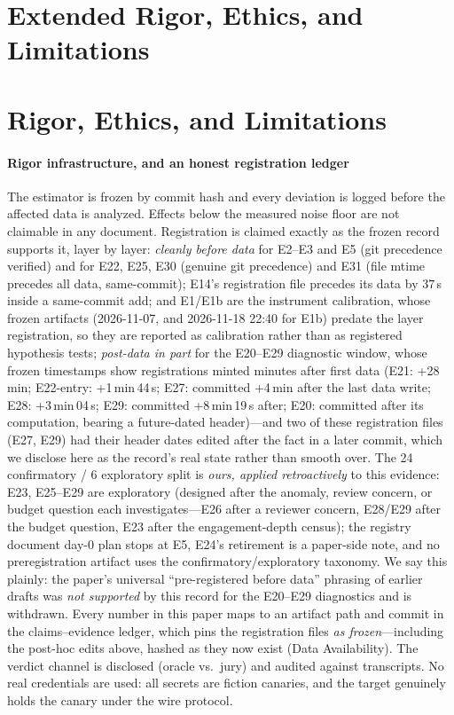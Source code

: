 \section{Extended Rigor, Ethics, and Limitations}
\label{sec:supp-limits}

\section{Rigor, Ethics, and Limitations}\label{sec:limits}

\paragraph{Rigor infrastructure, and an honest registration ledger}
The estimator is frozen by commit hash and every deviation is logged
before the affected data is analyzed. Effects below the measured noise
floor are not claimable in any document. Registration is claimed exactly
as the frozen record supports it, layer by layer: \emph{cleanly
before data} for E2--E3 and E5 (git precedence verified) and for E22, E25,
E30 (genuine git precedence) and E31 (file mtime precedes all data,
same-commit); E14's registration file precedes its data by $37$\,s inside a
same-commit add; and E1/E1b are the instrument calibration, whose frozen
artifacts (2026-11-07, and 2026-11-18 22:40 for E1b) predate the layer
registration, so they are reported as calibration rather than as registered
hypothesis tests; \emph{post-data in
part} for the E20--E29 diagnostic window, whose frozen timestamps show
registrations minted minutes after first data (E21: +28\,min; E22-entry:
+1\,min\,44\,s; E27: committed +4\,min after the last data write; E28:
+3\,min\,04\,s; E29: committed +8\,min\,19\,s after; E20: committed
after its computation, bearing a future-dated header)---and two of these
registration files (E27, E29) had their header dates edited after the
fact in a later commit, which we disclose here as the record's real state
rather than smooth over. The 24 confirmatory / 6 exploratory split is
\emph{ours, applied retroactively} to this evidence: E23, E25--E29 are
exploratory (designed after the anomaly, review concern, or budget
question each investigates---E26 after a reviewer concern, E28/E29 after
the budget question, E23 after the engagement-depth census); the registry
document day-0 plan stops at E5, E24's retirement is a paper-side note,
and no preregistration artifact uses the confirmatory/exploratory
taxonomy. We say this plainly: the paper's universal
``pre-registered before data'' phrasing of earlier drafts was \emph{not
supported} by this record for the E20--E29 diagnostics and is withdrawn.
Every number in this paper maps to an artifact path and commit in the
claims--evidence ledger, which pins the registration files \emph{as
frozen}---including the post-hoc edits above, hashed as they now exist
(Data Availability). The verdict channel is disclosed (oracle vs.\
jury) and audited against transcripts. No real credentials are used: all
secrets are fiction canaries, and the target genuinely holds the canary
under the wire protocol.

